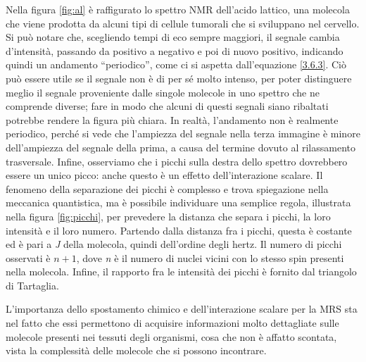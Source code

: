 \documentclass{report}
\newcommand{\virgolette}[1]{``#1''}
\newcommand{\figref}[1]{figura \ref{#1}}
\renewcommand{\eqref}[1]{equazione \ref{#1}}
\numberwithin{equation}{section}
\numberwithin{figure}{section}
\begin{document}
Nella \figref{fig:al} è raffigurato lo spettro NMR dell'acido lattico, una molecola che viene prodotta da alcuni tipi di cellule tumorali che si sviluppano nel cervello. Si può notare che, scegliendo tempi di eco sempre maggiori, il segnale cambia d'intensità, passando da positivo a negativo e poi di nuovo positivo, indicando quindi un andamento \virgolette{periodico}, come ci si aspetta dall'\eqref{3.6.3}. Ciò può essere utile se il segnale non è di per sé molto intenso, per poter distinguere meglio il segnale proveniente dalle singole molecole in uno spettro che ne comprende diverse; fare in modo che alcuni di questi segnali siano ribaltati potrebbe rendere la figura più chiara. In realtà, l'andamento non è realmente periodico, perché si vede che l'ampiezza del segnale nella terza immagine è minore dell'ampiezza del segnale della prima, a causa del termine dovuto al rilassamento trasversale. Infine, osserviamo che i picchi sulla destra dello spettro dovrebbero essere un unico picco: anche questo è un effetto dell'interazione scalare. Il fenomeno della separazione dei picchi è complesso e trova spiegazione nella meccanica quantistica, ma è possibile individuare una semplice regola, illustrata nella \figref{fig:picchi}, per prevedere la distanza che separa i picchi, la loro intensità e il loro numero. Partendo dalla distanza fra i picchi, questa è costante ed è pari a \textit{J} della molecola, quindi dell'ordine degli hertz. Il numero di picchi osservati è $n+1$, dove \textit{n} è il numero di nuclei vicini con lo stesso spin presenti nella molecola. Infine, il rapporto fra le intensità dei picchi è fornito dal triangolo di Tartaglia.

L'importanza dello spostamento chimico e dell'interazione scalare per la MRS sta nel fatto che essi permettono di acquisire informazioni molto dettagliate sulle molecole presenti nei tessuti degli organismi, cosa che non è affatto scontata, vista la complessità delle molecole che si possono incontrare.
\end{document}
